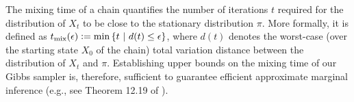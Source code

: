 The mixing time of a chain quantifies the number of iterations $t$ required for the distribution of $X_t$ to be close to the stationary distribution $\pi$.
More formally, it is defined as $t_{\mathrm{mix}}(\epsilon) \vcentcolon= \min \left\{t\ \middle\vert\  d(t) \leq \epsilon\right\}$, where $d(t)$ denotes the worst-case (over the starting state $X_0$ of the chain) total variation distance between the distribution of $X_t$ and $\pi$.
Establishing upper bounds on the mixing time of our Gibbs sampler is, therefore, sufficient to guarantee efficient approximate marginal inference (e.g., see Theorem 12.19 of \citet{levin08}).